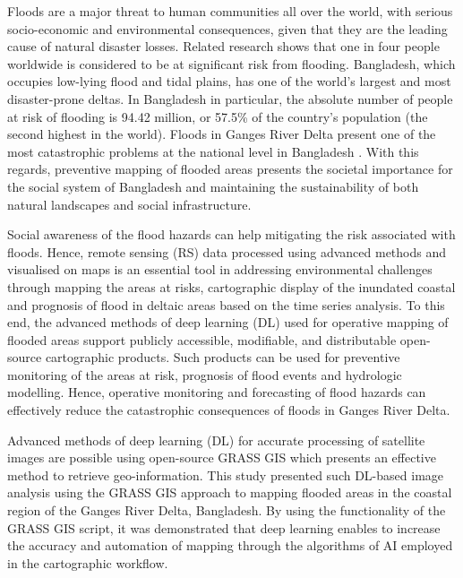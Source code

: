 \documentclass[water,article,submit,pdftex,moreauthors]{Definitions/mdpi}
\begin{document}
Floods are a major threat to human communities all over the world, with serious socio-economic and environmental consequences, given that they are the leading cause of natural disaster losses. Related research shows that one in four people worldwide is considered to be at significant risk from flooding. Bangladesh, which occupies low-lying flood and tidal plains, has one of the world's largest and most disaster-prone deltas. In Bangladesh in particular, the absolute number of people at risk of flooding is 94.42 million, or 57.5\% of the country's population (the second highest in the world). Floods in Ganges River Delta present one of the most catastrophic problems at the national level in Bangladesh \cite{Szabo}. With this regards, preventive mapping of flooded areas presents the societal importance for the social system of Bangladesh and maintaining the sustainability of both natural landscapes and social infrastructure. 

Social awareness of the flood hazards can help mitigating the risk associated with floods. Hence, remote sensing (RS) data processed using advanced methods and visualised on maps is an essential tool in addressing environmental challenges through mapping the areas at risks, cartographic display of the inundated coastal and prognosis of flood in deltaic areas based on the time series analysis. To this end, the advanced methods of deep learning (DL) used for operative mapping of flooded areas support publicly accessible, modifiable, and distributable open-source cartographic products. Such products can be used for preventive monitoring of the areas at risk, prognosis of flood events and hydrologic modelling. Hence, operative monitoring and forecasting of flood hazards can effectively reduce the catastrophic consequences of floods in Ganges River Delta. 

Advanced methods of deep learning (DL) for accurate processing of satellite images are possible using open-source GRASS GIS which presents an effective method to retrieve geo-information. This study presented such DL-based image analysis using the GRASS GIS approach to mapping flooded areas in the coastal region of the Ganges River Delta, Bangladesh. By using the functionality of the GRASS GIS script, it was demonstrated that deep learning enables to increase the accuracy and automation of mapping through the algorithms of AI employed in the cartographic workflow. 
\end{document}
